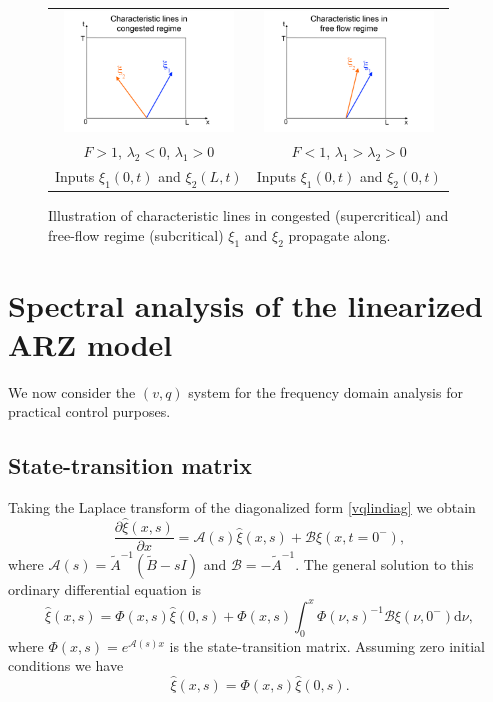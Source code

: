 \documentclass[5p,twocolumn]{elsarticle}
\begin{document}
\begin{figure}
\begin{centering}
\begin{tabular}{cc}
\includegraphics[width=4.5cm]{Congested-regime} & \includegraphics[width=4.5cm]{Free-flow-regime}
\tabularnewline
$F>1$, $\lambda_{2}<0$, $\lambda_{1}>0$ & $F<1$, $\lambda_{1}>\lambda_{2}>0$
\tabularnewline
Inputs $\xi_1(0,t)$ and $\xi_2(L,t)$ &
Inputs $\xi_1(0,t)$ and $\xi_2(0,t)$
\end{tabular}
\par\end{centering}
\protect\caption{Illustration of characteristic lines in congested (supercritical) and free-flow regime (subcritical) $\xi_1$ and $\xi_2$ propagate along.\label{Characteristics}}
\end{figure}


\section{Spectral analysis of the linearized ARZ model}
We now consider the $(v,q)$ system for the frequency domain analysis for practical control purposes.
\subsection{State-transition matrix}
Taking the Laplace transform of the diagonalized form \eqref{vqlindiag} we obtain 
\begin{equation}
\dfrac{\partial \hat{\xi} (x,s)}{\partial x} = \mathscr{A}(s)\hat{\xi}(x,s) + \mathscr{B}\xi(x,t=0^-),
\end{equation}
where $\mathscr{A}(s) = \tilde{A}^{-1}(\tilde{B} - sI)$ and $\mathscr{B} = -\tilde{A}^{-1}$. 
The general solution to this ordinary differential equation is 
\begin{equation}
\hat{\xi}(x,s) = \Phi(x,s)\hat{\xi}(0,s) +  \Phi(x,s) \int^x_0 \Phi(\nu,s)^{-1} \mathscr{B} \xi(\nu,0^-)\text{d} \nu,
\end{equation}
where $\Phi(x,s) = e^{\mathscr{A}(s)x}$ is the state-transition matrix. Assuming zero initial conditions we have 
\begin{equation} \label{TFRiemann}
\hat{\xi}(x,s) = \Phi(x,s)\hat{\xi}(0,s).
\end{equation}
\end{document}
